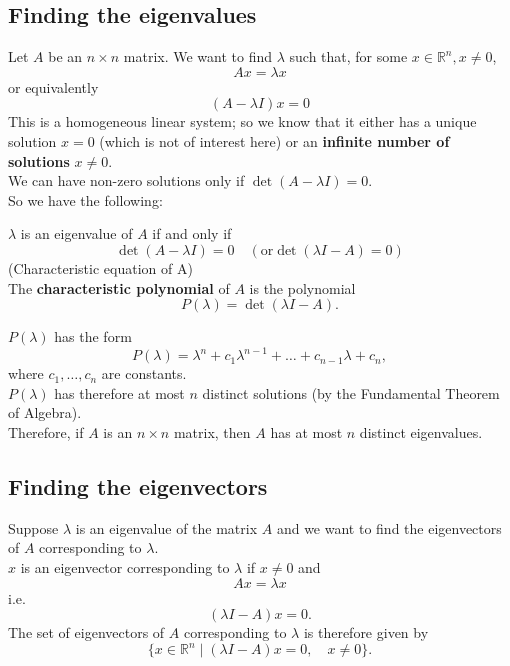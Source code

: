 \documentclass[a4paper, 12pt]{article}
\newenvironment{definition}[1][Definition]{\begin{trivlist}
\item[\hskip \labelsep {\bfseries #1}]}{\end{trivlist}}
\newenvironment{remark}[1][Remark]{\begin{trivlist}
\item[\hskip \labelsep {\bfseries #1}]}{\end{trivlist}}
\newcommand{\keyword}[1]{\textbf{#1}}
\begin{document}
    \subsection*{Finding the eigenvalues}
    Let $A$ be an $n \times n$ matrix. We want to find $\lambda$ such that, for some
    $x \in \mathbb{R}^n, x \neq 0$,
    \[Ax = \lambda x\]
    or equivalently
    \[(A - \lambda I)x = 0\]
    This is a homogeneous linear system; so we know that it either
    has a unique solution $x = 0$ (which is not of interest here) or an
    \keyword{infinite number of solutions} $x \neq 0$.\\
    We can have non-zero solutions only if $\det(A - \lambda I) = 0$.\\
    So we have the following:
    \begin{definition}
        $\lambda$ is an eigenvalue of $A$ if and only if
        \[\det(A - \lambda I) = 0 \quad (\text{or} \det(\lambda I - A) = 0)\]
        (Characteristic equation of A)\\
        The \keyword{characteristic polynomial} of $A$ is the polynomial
        \[P(\lambda) = \det(\lambda I - A).\]
    \end{definition}
    \begin{remark}
        $P(\lambda)$ has the form
        \[P(\lambda) = \lambda^n + c_1\lambda^{n-1} + \dots + c_{n-1}\lambda + c_n,\]
        where $c_1, \dots, c_n$ are constants.\\
        $P(\lambda)$ has therefore at most $n$ distinct solutions (by the
        Fundamental Theorem of Algebra).\\
        Therefore, if $A$ is an $n \times n$ matrix, then $A$ has at most $n$ distinct
        eigenvalues.
    \end{remark}
    \subsection*{Finding the eigenvectors}
    Suppose $\lambda$ is an eigenvalue of the matrix $A$ and we want to find
    the eigenvectors of $A$ corresponding to $\lambda$.\\
    $x$ is an eigenvector corresponding to $\lambda$ if $x \neq 0$ and
    \[Ax = \lambda x\]
    i.e.
    \[(\lambda I - A)x = 0.\]
    The set of eigenvectors of $A$ corresponding to $\lambda$ is therefore
    given by
   \[\{x \in \mathbb{R}^n \mid (\lambda I - A)x = 0, \quad x \neq 0\}.\]
\end{document}
